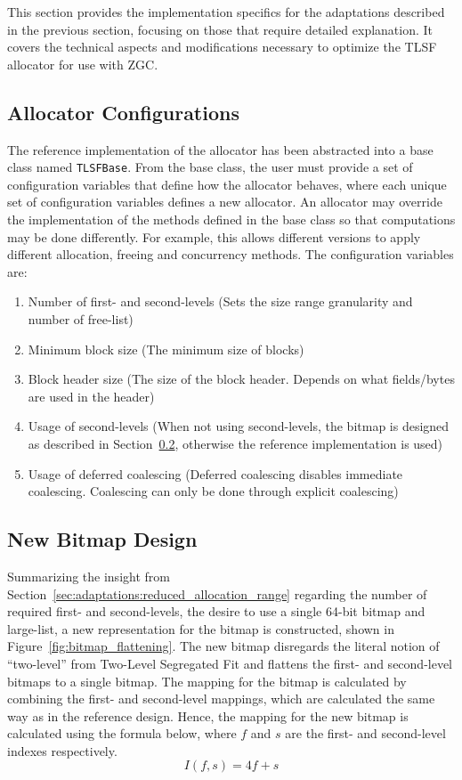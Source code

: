 
This section provides the implementation specifics for the adaptations described in the previous section, focusing on those that require detailed explanation. It covers the technical aspects and modifications necessary to optimize the TLSF allocator for use with ZGC.

\subsection{Allocator Configurations}

The reference implementation of the allocator has been abstracted into a base class named \texttt{TLSFBase}. From the base class, the user must provide a set of configuration variables that define how the allocator behaves, where each unique set of configuration variables defines a new allocator. An allocator may override the implementation of the methods defined in the base class so that computations may be done differently. For example, this allows different versions to apply different allocation, freeing and concurrency methods. The configuration variables are:

\begin{enumerate}
    \item Number of first- and second-levels (Sets the size range granularity and number of free-list)
    \item Minimum block size (The minimum size of blocks)
    \item Block header size (The size of the block header. Depends on what fields/bytes are used in the header)
    \item Usage of second-levels (When not using second-levels, the bitmap is designed as described in Section~\ref{sec:adaptations_impl:bitmap_design}, otherwise the reference implementation is used)
    \item Usage of deferred coalescing (Deferred coalescing disables immediate coalescing. Coalescing can only be done through explicit coalescing)
\end{enumerate}

\subsection{New Bitmap Design}
\label{sec:adaptations_impl:bitmap_design}

Summarizing the insight from Section~\ref{sec:adaptations:reduced_allocation_range} regarding the number of required first- and second-levels, the desire to use a single 64-bit bitmap and large-list, a new representation for the bitmap is constructed, shown in Figure~\ref{fig:bitmap_flattening}. The new bitmap disregards the literal notion of ``two-level'' from Two-Level Segregated Fit and flattens the first- and second-level bitmaps to a single bitmap. The mapping for the bitmap is calculated by combining the first- and second-level mappings, which are calculated the same way as in the reference design. Hence, the mapping for the new bitmap is calculated using the formula below, where $f$ and $s$ are the first- and second-level indexes respectively.
\[
    I(f, s) = 4f + s
\]

